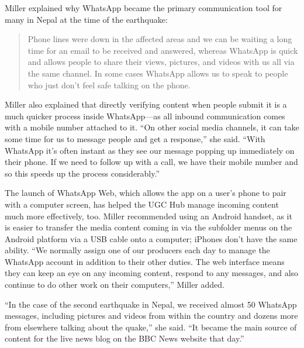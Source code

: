 \documentclass[notoc, symmetric, nobib, nols]{towcenter-guideto-book}
\begin{document}
Miller explained why WhatsApp became the primary communication tool for many in Nepal at the time of the earthquake: 

\begin{quote}
Phone lines were down in the affected areas and we can be waiting a long time for an email to be received and answered, whereas WhatsApp is quick and allows people to share their views, pictures, and videos with us all via the same channel. In some cases WhatsApp allows us to speak to people who just don't feel safe talking on the phone.
\end{quote}


 
Miller also explained that directly verifying content when people submit it is a much quicker process inside WhatsApp---as all inbound communication comes with a mobile number attached to it. ``On other social media channels, it can take some time for us to message people and get a response,'' she said. ``With WhatsApp it's often instant as they see our message popping up immediately on their phone. If we need to follow up with a call, we have their mobile number and so this speeds up the process considerably.''

The launch of WhatsApp Web,\autocite{WhatsAppWeb} which allows the app on a user's phone to pair with a computer screen, has helped the UGC Hub manage incoming content much more effectively, too. Miller recommended using an Android handset, as it is easier to transfer the media content coming in via the subfolder menus on the Android platform via a USB cable onto a computer; iPhones don't have the same ability. ``We normally assign one of our producers each day to manage the WhatsApp account in addition to their other duties. The web interface means they can keep an eye on any incoming content, respond to any messages, and also continue to do other work on their computers,'' Miller added.


``In the case of the second earthquake in Nepal, we received almost 50 WhatsApp messages, including pictures and videos from within the country and dozens more from elsewhere talking about the quake,'' she said. ``It became the main source of content for the live news blog on the BBC News website that day.''
 
\end{document}
